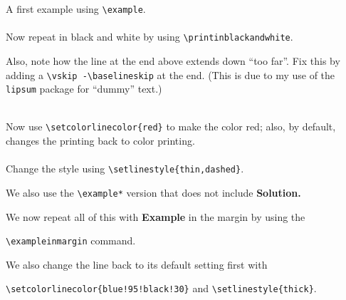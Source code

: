 \documentclass[10pt]{article}
\begin{document}
A first example using \verb|\example|. \\

\\

Now repeat in black and white by using \verb|\printinblackandwhite|.

Also, note how the line at the end above extends down ``too far''. Fix this by adding a \verb|\vskip -\baselineskip| at the end. (This is due to my use of the \verb|lipsum| package for ``dummy'' text.)\\

\printinblackandwhite

\\

Now use \verb|\setcolorlinecolor{red}| to make the color red; also, by default, changes the printing back to color printing. \\

\\

Change the style using \verb|\setlinestyle{thin,dashed}|.

We also use the \verb|\example*| version that does not include {\bf Solution.}\\


We now repeat all of this with {\bf Example} in the margin by using the 

\noindent\verb|\exampleinmargin| command. 

We also change the line back to its default setting first with 

\noindent\verb|\setcolorlinecolor{blue!95!black!30}| and \verb|\setlinestyle{thick}|.\\

\exampleinmargin

\\

\printinblackandwhite

\\

\\

\end{document}
